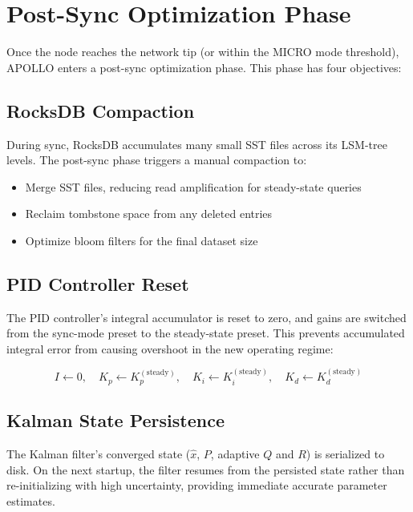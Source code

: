 \documentclass[11pt,a4paper]{article}
\begin{document}
\section{Post-Sync Optimization Phase}
\label{sec:postsync}

Once the node reaches the network tip (or within the MICRO mode threshold), APOLLO enters a post-sync optimization phase. This phase has four objectives:

\subsection{RocksDB Compaction}

During sync, RocksDB accumulates many small SST files across its LSM-tree levels. The post-sync phase triggers a manual compaction to:
\begin{itemize}
    \item Merge SST files, reducing read amplification for steady-state queries
    \item Reclaim tombstone space from any deleted entries
    \item Optimize bloom filters for the final dataset size
\end{itemize}

\subsection{PID Controller Reset}

The PID controller's integral accumulator is reset to zero, and gains are switched from the sync-mode preset to the steady-state preset. This prevents accumulated integral error from causing overshoot in the new operating regime:

\begin{equation}
I \gets 0, \quad K_p \gets K_p^{(\text{steady})}, \quad K_i \gets K_i^{(\text{steady})}, \quad K_d \gets K_d^{(\text{steady})}
\end{equation}

\subsection{Kalman State Persistence}

The Kalman filter's converged state ($\hat{x}$, $P$, adaptive $Q$ and $R$) is serialized to disk. On the next startup, the filter resumes from the persisted state rather than re-initializing with high uncertainty, providing immediate accurate parameter estimates.
\end{document}
